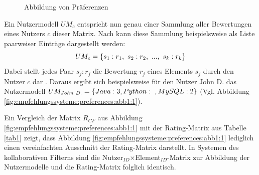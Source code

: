 \begin{figure}[H]
    \centering
    \\
    \\
  \caption{Abbildung von Präferenzen} \label{fig:empfehlungssysteme:preferences:abb1}
\end{figure}

Ein Nutzermodell $UM_{c}$ entspricht nun genau einer Sammlung aller Bewertungen eines Nutzers $c$ dieser Matrix.
Nach \textcite[S. 41]{berkovsky:2:article} kann diese Sammlung beispielsweise als Liste paarweiser Einträge dargestellt werden:
\begin{equation}\label{eq6}
    UM_{c} = \{s_{1}:r_{1},\textnormal{ }s_{2}:r_{2},\textnormal{ }...,\textnormal{ }s_{k}:r_{k}\}
\end{equation}
Dabei stellt jedes Paar $s_{j}:r_{j}$ die Bewertung $r_{j}$ eines Elements $s_{j}$ durch den Nutzer $c$ dar \cite[S. 41]{berkovsky:2:article}.
Daraus ergibt sich beispielsweise für den Nutzer John D. das Nutzermodell $UM_{John\textnormal{ }D.} = \{Java: 3, Python:\textnormal{ }, MySQL: 2\}$ (Vgl. Abbildung \ref{fig:empfehlungssysteme:preferences:abb1:1}).

Ein Vergleich der Matrix $R_{CF}$ aus Abbildung \ref{fig:empfehlungssysteme:preferences:abb1:1} mit der Rating-Matrix aus Tabelle \ref{tab1} zeigt, dass Abbildung \ref{fig:empfehlungssysteme:preferences:abb1:1} lediglich einen vereinfachten Ausschnitt der Rating-Matrix darstellt.
In Systemen des kollaborativen Filterns sind die Nutzer$_{ID}$$\times$Element$_{ID}$-Matrix zur Abbildung der Nutzermodelle und die Rating-Matrix folglich identisch.

